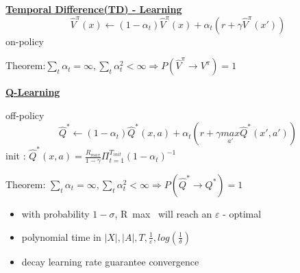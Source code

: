 \documentclass[landscape,a0paper,fontscale=0.285]{baposter} %
\newcommand{\compresslist}{ %
\setlength{\itemsep}{1pt}
\setlength{\parskip}{0pt}
\setlength{\parsep}{0pt}
}
\begin{document}
\begin{poster}
{\underline{\textbf{Temporal Difference(TD) - Learning}}
\vspace{-0.2cm}
$$
\hat V^\pi (x)\leftarrow (1-\alpha_t)\hat V^\pi (x) + \alpha_t(r+\gamma\hat V^\pi (x'))
$$
on-policy 

Theorem:$
\sum_t\alpha_t=\infty,\sum_t\alpha_t^2 < \infty \Rightarrow P(\hat V^\pi\rightarrow  V^\pi) = 1
$

\underline{\textbf{Q-Learning}}


off-policy\vspace{-0.2cm}
$$
\hat Q^* \leftarrow (1-\alpha_t)\hat Q^*(x,a) + \alpha_t(r+\gamma \underset{a'}{max}\hat Q^*(x',a'))
$$
init : $\hat Q^*(x,a) = \frac{R_{max}}{1-\gamma}\Pi_{t=1}^{T_{init}}(1-\alpha_t)^{-1}$

Theorem: $\sum_t\alpha_t=\infty,\sum_t\alpha_t^2 < \infty \Rightarrow P(\hat Q^*\rightarrow  Q^*) = 1$  
\begin{itemize}\compresslist
    \item with probability $1-\sigma$,  R~max~ will reach an $\varepsilon$ - optimal
    \item polynomial time in $|X|, |A|, T,\frac{1}{\varepsilon},log(\frac{1}{\delta})$
    \item decay learning rate guarantee convergence
\end{itemize}
}

\end{poster}
\end{document}
